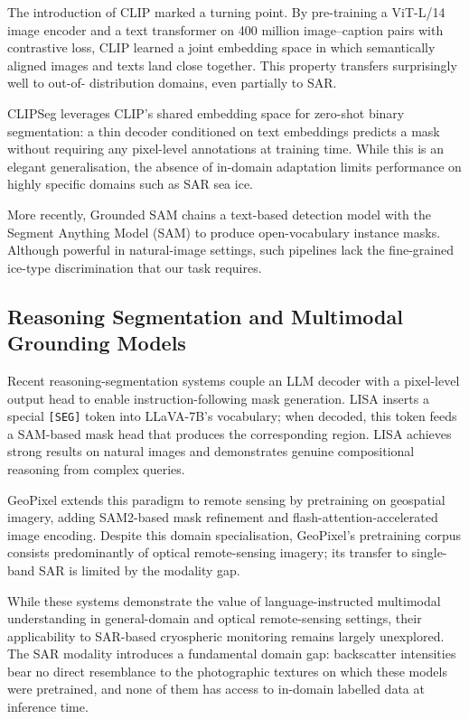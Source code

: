 \documentclass[remotesensing,article,accept,moreauthors,pdftex]{Definitions/mdpi}
\begin{document}
The introduction of CLIP \cite{radford2021learning} marked a turning point. By
pre-training a ViT-L/14 image encoder \cite{dosovitskiy2021image} and a text
transformer on 400 million image--caption pairs with contrastive loss, CLIP
learned a joint embedding space in which semantically aligned images and texts
land close together. This property transfers surprisingly well to out-of-
distribution domains, even partially to SAR.

CLIPSeg \cite{luddecke2022image} leverages CLIP's shared embedding space for
zero-shot binary segmentation: a thin decoder conditioned on text embeddings
predicts a mask without requiring any pixel-level annotations at training time.
While this is an elegant generalisation, the absence of in-domain adaptation
limits performance on highly specific domains such as SAR sea ice.

More recently, Grounded SAM \cite{kirillov2023segment} chains a text-based
detection model with the Segment Anything Model (SAM) \cite{kirillov2023segment}
to produce open-vocabulary instance masks. Although powerful in natural-image
settings, such pipelines lack the fine-grained ice-type discrimination that our
task requires.

\subsection{Reasoning Segmentation and Multimodal Grounding Models}

Recent reasoning-segmentation systems couple an LLM decoder with a pixel-level
output head to enable instruction-following mask generation. LISA
\cite{lai2024lisa} inserts a special \texttt{[SEG]} token into LLaVA-7B's
vocabulary; when decoded, this token feeds a SAM-based mask head that produces
the corresponding region. LISA achieves strong results on natural images and
demonstrates genuine compositional reasoning from complex queries.

GeoPixel \cite{geopixel2024} extends this paradigm to remote sensing by
pretraining on geospatial imagery, adding SAM2-based mask refinement and
flash-attention-accelerated image encoding. Despite this domain specialisation,
GeoPixel's pretraining corpus consists predominantly of optical remote-sensing
imagery; its transfer to single-band SAR is limited by the modality gap.

While these systems demonstrate the value of language-instructed multimodal
understanding in general-domain and optical remote-sensing settings, their
applicability to SAR-based cryospheric monitoring remains largely unexplored.
The SAR modality introduces a fundamental domain gap: backscatter intensities
bear no direct resemblance to the photographic textures on which these models
were pretrained, and none of them has access to in-domain labelled data at
inference time.
\end{document}
